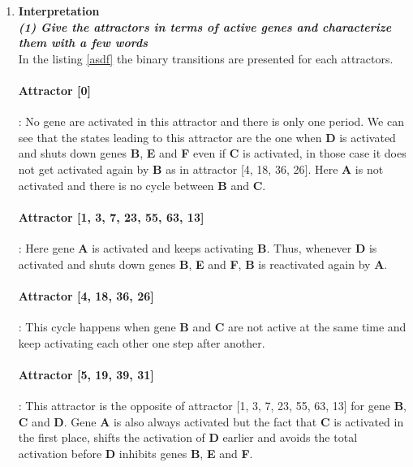 \documentclass[10pt,a4paper]{article}
\begin{document}
\begin{enumerate}
\newpage
\item \textbf{Interpretation}\\

\textbf{\textit{(1) Give the attractors in terms of active genes and characterize them with a few words}}\\


In the listing \ref{asdf} the binary transitions are presented for each attractors. \\

\paragraph{Attractor {[}0{]}}: No gene are activated in this attractor and there is only one period. We can see that the states leading to this attractor are the one when \textbf{D} is activated and shuts down genes \textbf{B}, \textbf{E} and \textbf{F} even if \textbf{C} is activated, in those case it does not get activated again by \textbf{B} as in attractor {[}4, 18, 36, 26{]}. Here \textbf{A} is not activated and there is no cycle between \textbf{B} and \textbf{C}. 

\paragraph{Attractor 	{[}1, 3, 7, 23, 55, 63, 13{]}}: Here gene \textbf{A} is activated and keeps activating \textbf{B}. Thus, whenever \textbf{D} is activated and shuts down genes \textbf{B}, \textbf{E} and \textbf{F}, \textbf{B} is reactivated again by \textbf{A}.

\paragraph{Attractor {[}4, 18, 36, 26{]}}: This cycle happens when gene \textbf{B} and \textbf{C} are not active at the same time and keep activating each other one step after another. 

\paragraph{Attractor {[}5, 19, 39, 31{]}}: This attractor is the opposite of attractor {[}1, 3, 7, 23, 55, 63, 13{]} for gene \textbf{B}, \textbf{C} and \textbf{D}. Gene \textbf{A} is also always activated but the fact that \textbf{C} is activated in the first place, shifts the activation of \textbf{D} earlier and avoids the total activation before \textbf{D} inhibits genes \textbf{B}, \textbf{E} and \textbf{F}. 




\end{enumerate}
\end{document}
